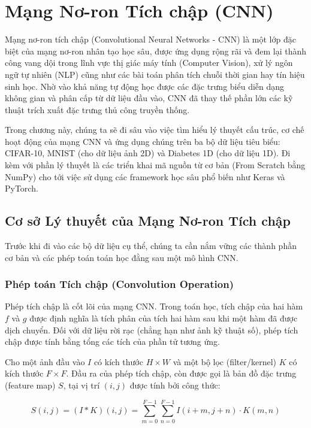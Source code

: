 \section{Mạng Nơ-ron Tích chập (CNN)}

Mạng nơ-ron tích chập (Convolutional Neural Networks - CNN) là một lớp đặc biệt của mạng nơ-ron nhân tạo học sâu, được ứng dụng rộng rãi và đem lại thành công vang dội trong lĩnh vực thị giác máy tính (Computer Vision), xử lý ngôn ngữ tự nhiên (NLP) cũng như các bài toán phân tích chuỗi thời gian hay tín hiệu sinh học. Nhờ vào khả năng tự động học được các đặc trưng biểu diễn dạng không gian và phân cấp từ dữ liệu đầu vào, CNN đã thay thế phần lớn các kỹ thuật trích xuất đặc trưng thủ công truyền thống.

Trong chương này, chúng ta sẽ đi sâu vào việc tìm hiểu lý thuyết cấu trúc, cơ chế hoạt động của mạng CNN và ứng dụng chúng trên ba bộ dữ liệu tiêu biểu: CIFAR-10, MNIST (cho dữ liệu ảnh 2D) và Diabetes 1D (cho dữ liệu 1D). Đi kèm với phần lý thuyết là các triển khai mã nguồn từ cơ bản (From Scratch bằng NumPy) cho tới việc sử dụng các framework học sâu phổ biến như Keras và PyTorch.

\newpage
\subsection{Cơ sở Lý thuyết của Mạng Nơ-ron Tích chập}

Trước khi đi vào các bộ dữ liệu cụ thể, chúng ta cần nắm vững các thành phần cơ bản và các phép toán toán học đằng sau một mô hình CNN.

\subsubsection{Phép toán Tích chập (Convolution Operation)}

Phép tích chập là cốt lõi của mạng CNN. Trong toán học, tích chập của hai hàm $f$ và $g$ được định nghĩa là tích phân của tích hai hàm sau khi một hàm đã được dịch chuyển. Đối với dữ liệu rời rạc (chẳng hạn như ảnh kỹ thuật số), phép tích chập được tính bằng tổng các tích của phần tử tương ứng.

Cho một ảnh đầu vào $I$ có kích thước $H \times W$ và một bộ lọc (filter/kernel) $K$ có kích thước $F \times F$. Đầu ra của phép tích chập, còn được gọi là bản đồ đặc trưng (feature map) $S$, tại vị trí $(i, j)$ được tính bởi công thức:

\begin{equation}
    S(i, j) = (I * K)(i, j) = \sum_{m=0}^{F-1} \sum_{n=0}^{F-1} I(i + m, j + n) \cdot K(m, n)
\end{equation}

